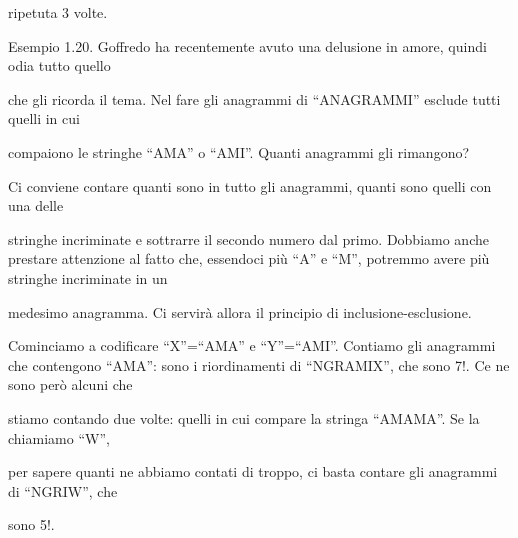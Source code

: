 \documentclass[a4paper,portrait,12pt]{article}
\begin{document}
\begin{flushleft}
ripetuta 3 volte.
\end{flushleft}


\begin{flushleft}
Esempio 1.20. Goffredo ha recentemente avuto una delusione in amore, quindi odia tutto quello
\end{flushleft}


\begin{flushleft}
che gli ricorda il tema. Nel fare gli anagrammi di ``ANAGRAMMI'' esclude tutti quelli in cui
\end{flushleft}


\begin{flushleft}
compaiono le stringhe ``AMA'' o ``AMI''. Quanti anagrammi gli rimangono?
\end{flushleft}


\begin{flushleft}
Ci conviene contare quanti sono in tutto gli anagrammi, quanti sono quelli con una delle
\end{flushleft}


\begin{flushleft}
stringhe incriminate e sottrarre il secondo numero dal primo. Dobbiamo anche prestare attenzione al fatto che, essendoci più ``A'' e ``M'', potremmo avere più stringhe incriminate in un
\end{flushleft}


\begin{flushleft}
medesimo anagramma. Ci servir\`{a} allora il principio di inclusione-esclusione.
\end{flushleft}


\begin{flushleft}
Cominciamo a codificare ``X''=``AMA'' e ``Y''=``AMI''. Contiamo gli anagrammi che contengono ``AMA'': sono i riordinamenti di ``NGRAMIX'', che sono 7!. Ce ne sono per\`{o} alcuni che
\end{flushleft}


\begin{flushleft}
stiamo contando due volte: quelli in cui compare la stringa ``AMAMA''. Se la chiamiamo ``W'',
\end{flushleft}


\begin{flushleft}
per sapere quanti ne abbiamo contati di troppo, ci basta contare gli anagrammi di ``NGRIW'', che
\end{flushleft}


\begin{flushleft}
sono 5!.
\end{flushleft}
\end{document}

